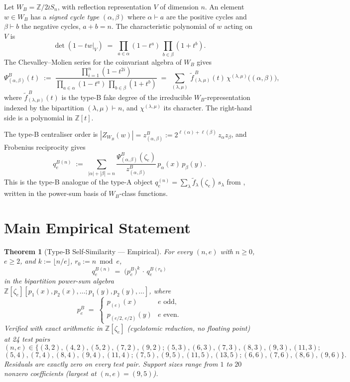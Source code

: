 \documentclass[11pt]{article}
\newtheorem{theorem}{Theorem}
\theoremstyle{remark}
\newcommand{\ftilde}{\widetilde{f}}
\newcommand{\qe}{q_e}
\newcommand{\qeB}{q_e^B}
\newcommand{\peB}{p_e^B}
\newcommand{\zetae}{\zeta_e}
\newcommand{\ZZ}{\mathbb{Z}}
\begin{document}
Let $W_B = \ZZ/2 \wr S_n$, with reflection representation $V$ of dimension $n$. An element $w \in W_B$ has a \emph{signed cycle type} $(\alpha, \beta)$ where $\alpha \vdash a$ are the positive cycles and $\beta \vdash b$ the negative cycles, $a + b = n$. The characteristic polynomial of $w$ acting on $V$ is
\[
  \det(1 - tw|_V) \;=\; \prod_{a \in \alpha}(1 - t^a)\, \prod_{b \in \beta}(1 + t^b).
\]
The Chevalley--Molien series for the coinvariant algebra of $W_B$ gives
\begin{equation}\label{eq:cm-B}
  \Psi^B_{(\alpha,\beta)}(t) \;:=\; \frac{\prod_{i=1}^n(1-t^{2i})}{\prod_{a \in \alpha}(1 - t^a)\, \prod_{b \in \beta}(1 + t^b)}
  \;=\; \sum_{(\lambda,\mu)}\, \ftilde^{\,B}_{(\lambda, \mu)}(t)\, \chi^{(\lambda,\mu)}\bigl((\alpha,\beta)\bigr),
\end{equation}
where $\ftilde^{\,B}_{(\lambda,\mu)}(t)$ is the type-B fake degree of the irreducible $W_B$-representation indexed by the bipartition $(\lambda, \mu) \vdash n$, and $\chi^{(\lambda,\mu)}$ its character. The right-hand side is a polynomial in $\ZZ[t]$.

The type-B centraliser order is $|Z_{W_B}(w)| = z^B_{(\alpha, \beta)} := 2^{\ell(\alpha) + \ell(\beta)}\, z_\alpha z_\beta$, and Frobenius reciprocity gives
\begin{equation}\label{eq:qeB-def}
  \qeB^{(n)} \;:=\; \sum_{|\alpha|+|\beta|=n} \frac{\Psi^B_{(\alpha,\beta)}(\zetae)}{z^B_{(\alpha,\beta)}}\, p_\alpha(x)\, p_\beta(y).
\end{equation}
This is the type-B analogue of the type-A object $\qe^{(n)} = \sum_\lambda \ftilde_\lambda(\zetae)\, s_\lambda$ from \cite{Cli26-selfsim}, written in the power-sum basis of $W_B$-class functions.

\section{Main Empirical Statement}

\begin{theorem}[Type-B Self-Similarity --- Empirical]\label{thm:main-empirical}
For every $(n, e)$ with $n \ge 0$, $e \ge 2$, and $k := \lfloor n/e\rfloor$, $r_0 := n \bmod e$,
\[
  \qeB^{(n)} \;=\; \bigl(\peB\bigr)^{k}\, \cdot\, \qeB^{(r_0)}
\]
in the bipartition power-sum algebra $\ZZ[\zetae][p_1(x), p_2(x), \ldots; p_1(y), p_2(y), \ldots]$, where
\[
  \peB \;=\; \begin{cases}
    p_{(e)}(x) & e \text{ odd,} \\
    p_{(e/2,\, e/2)}(y) & e \text{ even.}
  \end{cases}
\]
Verified with exact arithmetic in $\ZZ[\zetae]$ (cyclotomic reduction, no floating point) at 24 test pairs
\[
  (n, e) \in \{
    (3,2), (4,2), (5,2), (7,2), (9,2);
    (5,3), (6,3), (7,3), (8,3), (9,3), (11,3);
\]
\[
    (5,4), (7,4), (8,4), (9,4), (11,4);
    (7,5), (9,5), (11,5), (13,5);
    (6,6), (7,6), (8,6), (9,6)\}.
\]
Residuals are exactly zero on every test pair. Support sizes range from $1$ to $20$ nonzero coefficients (largest at $(n,e) = (9,5)$).
\end{theorem}
\end{document}
